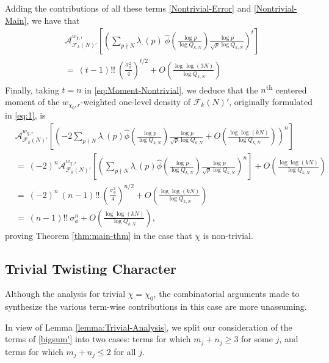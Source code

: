 \documentclass[12pt, reqno,oneside]{amsart}
\theoremstyle{plain}
\theoremstyle{definition}
\theoremstyle{remark}
\theoremstyle{plain}
\numberwithin{equation}{section}
\begin{document}
Adding the contributions of all these terms \eqref{Nontrivial-Error} and \eqref{Nontrivial-Main}, we have that 
\begin{align}
\nonumber
&\mathcal{A}^{w_{\chi,r}}_{\mathcal{F}_k(N)'}\left[\left(\sum\nolimits_{p\nmid N}\lambda_\cdot(p) \ \widehat{\phi}\left(\frac{\log p}{\log Q_{k,N}}\right)\frac{\log p}{\sqrt{p}\log Q_{k,N}}\right)^t\right] \\
\label{eq:Moment-Nontrivial}
&= \ (t-1)!! \ \left(\frac{\sigma_\phi^2}{4}\right)^{t/2}+O\left(\frac{\log\log(3N)}{\log Q_{k,N}}\right)
\end{align}
Finally, taking $t = n$ in \eqref{eq:Moment-Nontrivial}, we deduce that the $n$\textsuperscript{th} centered moment of the $w_{\chi_0,r}$-weighted one-level density of $\mathcal{F}_{k}(N)'$, originally formulated in \eqref{eq:1}, is
\begin{align}
& \mathcal{A}^{w_{\chi,r}}_{\mathcal{F}_k(N)'}\left[\left(-2\sum_{p\nmid N}\lambda_\cdot(p)\widehat{\phi}\left(\frac{\log p}{\log Q_{k,N}}\right)\frac{\log p}{\sqrt{p}\log Q_{k,N}}+O\left(\frac{\log\log(kN)}{\log Q_{k,N}}\right)\right)^n\right] \\
& = \  (-2)^n \mathcal{A}^{w_{\chi,r}}_{\mathcal{F}_k(N)'}\left[\left(\sum_{p\nmid N}\lambda_\cdot(p)\widehat{\phi}\left(\frac{\log p}{\log Q_{k,N}}\right)\frac{\log p}{\sqrt{p}\log Q_{k,N}}\right)^n\right] + O\left(\frac{\log\log(kN)}{\log Q_{k,N}}\right) \\
& = \ (-2)^n \ (n-1)!! \ \left(\frac{\sigma_\phi^2}{4}\right)^{n/2}+O\left(\frac{\log\log(kN)}{\log Q_{k,N}}\right) \\
& = \ (n-1)!! \ \sigma_\phi^n+O\left(\frac{\log\log(kN)}{\log Q_{k,N}}\right),
\end{align} 
proving Theorem \ref{thm:main-thm} in the case that $\chi$ is non-trivial. 

\subsection{Trivial Twisting Character}\label{subsec:5.2}
Although the analysis for trivial $\chi = \chi_0$, the combinatorial arguments made to synthesize the various term-wise contributions in this case are more unassuming. 

In view of Lemma \ref{lemma:Trivial-Analysis}, we split our consideration of the terms of \eqref{bigsum'} into two cases: terms for which $m_j+n_j\geq3$ for some $j$, and terms for which $m_j+n_j\leq2$ for all $j$. 
\end{document}
